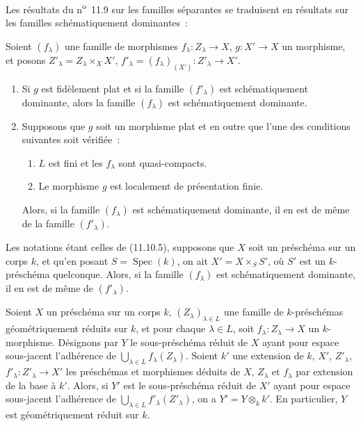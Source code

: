 Les résultats du n\textsuperscript{o}~11.9 sur les familles séparantes se traduisent en
résultats sur les familles schématiquement dominantes~:

\begin{theorem}[11.10.5]
\label{IV.11.10.5-fr}
Soient $(f_\lambda)$ une famille de morphismes
$f_\lambda:Z_\lambda\to X$, $g:X'\to X$ un morphisme, et posons
$Z'_\lambda=Z_\lambda\times_XX'$,
$f'_\lambda=(f_\lambda)_{(X')}:Z'_\lambda\to X'$.
\begin{enumerate}[label=\textup{(\roman*)}]
  \item Si $g$ est fidèlement plat et si la famille $(f'_\lambda)$ est
  schématiquement dominante, alors la famille $(f_\lambda)$ est
  schématiquement dominante.
  \item Supposons que $g$ soit un morphisme plat et en outre que \textup{l'une} des
  conditions suivantes soit vérifiée~:
  \begin{enumerate}[label=\emph{\alph*)}]
    \item $L$ est fini et les $f_\lambda$ sont quasi-compacts.
    \item Le morphisme $g$ est localement de présentation finie.
  \end{enumerate}

  Alors, si la famille $(f_\lambda)$ est schématiquement dominante, il en est
  de même de la famille $(f'_\lambda)$.
\end{enumerate}
\end{theorem}

\begin{proposition}[11.10.6]
\label{IV.11.10.6-fr}
Les notations étant celles de \textup{(11.10.5)}, supposons que $X$ soit un préschéma
sur un corps $k$, et qu'en posant $S=\operatorname{Spec}(k)$, on ait
$X'=X\times_SS'$, où $S'$ est un $k$-préschéma quelconque. Alors, si la famille
$(f_\lambda)$ est schématiquement dominante, il en est de même de
$(f'_\lambda)$.
\end{proposition}

\begin{corollary}[11.10.7]
\label{IV.11.10.7-fr}
Soient $X$ un préschéma sur un corps $k$, $(Z_\lambda)_{\lambda\in L}$ une
famille de $k$-préschémas géométriquement réduits sur $k$, et pour chaque
$\lambda\in L$, soit $f_\lambda:Z_\lambda\to X$ un $k$-morphisme. Désignons
par $Y$ le sous-préschéma réduit de $X$ ayant pour espace sous-jacent
l'adhérence de $\bigcup_{\lambda\in L}f_\lambda(Z_\lambda)$. Soient $k'$ une
extension de $k$, $X'$, $Z'_\lambda$,
$f'_\lambda:Z'_\lambda\to X'$ les préschémas et morphismes déduits de $X$,
$Z_\lambda$ et $f_\lambda$ par extension de la base à $k'$. Alors, si $Y'$ est
le sous-préschéma réduit de $X'$ ayant pour espace sous-jacent l'adhérence de
$\bigcup_{\lambda\in L}f'_\lambda(Z'_\lambda)$, on a
$Y'=Y\otimes_k k'$. En particulier, $Y$ est géométriquement réduit sur $k$.
\end{corollary}

